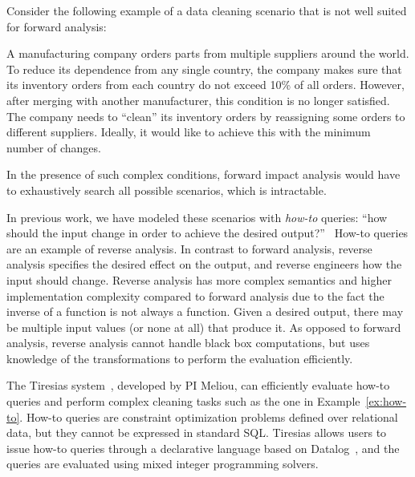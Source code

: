 Consider the following example of a data cleaning scenario that is not
well suited for forward analysis:

\begin{example}\label{ex:how-to}
A manufacturing company orders parts from multiple suppliers around
the world. To reduce its dependence from any single country, the
company makes sure that its inventory orders from each country do not
exceed 10\% of all orders. However, after merging with another
manufacturer, this condition is no longer satisfied. The company needs
to ``clean'' its inventory orders by reassigning some orders to
different suppliers. Ideally, it would like to achieve this with the
minimum number of changes.
\end{example}

In the presence of such complex conditions, forward impact analysis
would have to exhaustively search all possible scenarios, which is
intractable.

In previous work, we have modeled these scenarios with \emph{how-to}
queries: ``how should the input change in order to achieve the desired
output?''~\cite{DBLP:journals/pvldb/MeliouGS11} How-to queries are an
example of reverse analysis. In contrast to forward analysis,
reverse analysis specifies the desired effect on the output, and
reverse engineers how the input should change. Reverse analysis has
more complex semantics and higher implementation complexity compared
to forward analysis due to the fact the inverse of a function is not
always a function. Given a desired output, there may be multiple input
values (or none at all) that produce it.  As opposed to forward
analysis, reverse analysis cannot handle black box computations, but
uses knowledge of the transformations to perform the evaluation
efficiently.



The Tiresias system~\cite{DBLP:conf/sigmod/MeliouS12,
  DBLP:conf/sigmod/MeliouSS12}, developed by PI Meliou, can
efficiently evaluate how-to queries and perform complex cleaning
tasks such as the one in Example~\ref{ex:how-to}. How-to queries are
constraint optimization problems defined over relational data, but
they cannot be expressed in standard SQL. Tiresias allows users to
issue how-to queries through a declarative language based on
Datalog~\cite{DBLP:journals/tkde/CeriGT89}, and the queries are
evaluated using mixed integer programming solvers.

